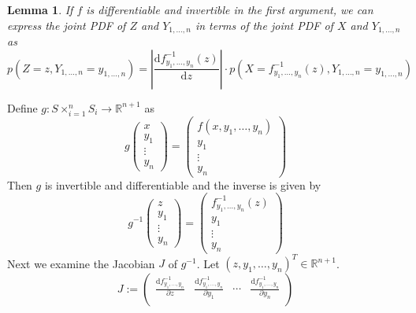 \documentclass[11pt,a4paper]{book}
\newtheorem{lemma}{Lemma}
\begin{document}
\begin{lemma}
  \label{lemma:joint-pdf}
  If $f$ is differentiable and invertible in the first argument, we can express
  the joint PDF of $Z$ and $Y_{1, \dots, n}$ in terms of the joint PDF of $X$
  and $Y_{1, \dots, n}$ as
  \begin{equation*}
    p(Z = z, Y_{1, \dots, n} = y_{1, \dots, n}) = \left| \frac{\mathrm{d}f_{y_{1}, \dots, y_{n}}^{-1}(z)}{\mathrm{d}z} \right| \cdot p\left(X = f_{y_{1}, \dots, y_{n}}^{-1}(z), Y_{1, \dots, n} = y_{1, \dots, n}\right)
  \end{equation*}
\end{lemma}
\begin{proof2}
  Define $g : S \times_{i = 1}^{n} S_{i} \rightarrow \mathbb{R}^{n + 1}$ as
  \begin{equation*}
    g \begin{pmatrix}
      x\\y_{1}\\\vdots\\y_{n}
    \end{pmatrix} = \begin{pmatrix}
      f(x, y_{1}, \dots, y_{n})\\
      y_{1}\\\vdots\\y_{n}
    \end{pmatrix}
  \end{equation*}
  Then $g$ is invertible and differentiable and the inverse is given by
  \begin{equation*}
    g^{-1}\begin{pmatrix}
      z\\y_{1}\\\vdots\\y_{n}
    \end{pmatrix} = \begin{pmatrix}
      f_{y_{1}, \dots, y_{n}}^{-1}(z)\\
      y_{1}\\\vdots\\y_{n}
    \end{pmatrix}
  \end{equation*}
  Next we examine the Jacobian $J$ of $g^{-1}$. Let
  $(z, y_{1}, \dots, y_{n})^{T} \in \mathbb{R}^{n + 1}$.
  \begin{equation*}
    J :=
    \begin{pmatrix}
      \frac{\mathrm{d}f_{y_{1}, \dots, y_{n}}^{-1}}{\partial z} & \frac{\mathrm{d}f_{y_{1}, \dots, y_{n}}^{-1}}{\partial y_{1}} & \cdots & \frac{\mathrm{d}f_{y_{1}, \dots, y_{n}}^{-1}}{\partial y_{n}}\\

\end{pmatrix}
\end{equation*}
\end{proof2}
\end{document}
